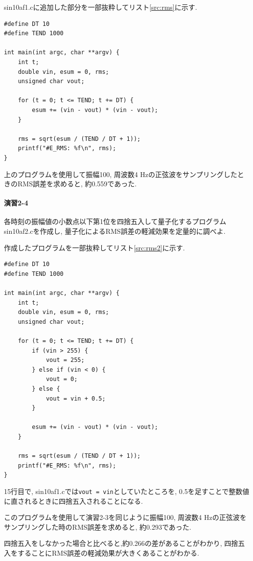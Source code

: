 \documentclass[titlepage]{jsarticle}
\begin{document}
        sin10af1.cに追加した部分を一部抜粋してリスト\ref{src:rms}に示す.
        

        \begin{lstlisting}[caption=sin10af1.c, label=src:rms]
#define DT 10
#define TEND 1000

int main(int argc, char **argv) {
    int t;
    double vin, esum = 0, rms;
    unsigned char vout;

    for (t = 0; t <= TEND; t += DT) {
        esum += (vin - vout) * (vin - vout);
    }

    rms = sqrt(esum / (TEND / DT + 1));
    printf("#E_RMS: %f\n", rms);
}\end{lstlisting}

        上のプログラムを使用して振幅100, 周波数4 Hzの正弦波をサンプリングしたときのRMS誤差を求めると,
        約0.559であった.

    \paragraph{演習2-4} 各時刻の振幅値の小数点以下第1位を四捨五入して量子化するプログラムsin10af2.cを作成し,
    量子化によるRMS誤差の軽減効果を定量的に調べよ.

        作成したプログラムを一部抜粋してリスト\ref{src:rms2}に示す.

        \begin{lstlisting}[caption=sin10af2.c, label=src:rms2]
#define DT 10
#define TEND 1000

int main(int argc, char **argv) {
    int t;
    double vin, esum = 0, rms;
    unsigned char vout;

    for (t = 0; t <= TEND; t += DT) {
        if (vin > 255) {
            vout = 255;
        } else if (vin < 0) {
            vout = 0;
        } else {
            vout = vin + 0.5;
        }

        esum += (vin - vout) * (vin - vout);
    }

    rms = sqrt(esum / (TEND / DT + 1));
    printf("#E_RMS: %f\n", rms);
}\end{lstlisting}

        15行目で, sin10af1.cでは\verb|vout = vin|としていたところを,
        0.5を足すことで整数値に直されるときに四捨五入されることになる.

        このプログラムを使用して演習2-3を同じように振幅100, 周波数4 Hzの正弦波をサンプリングした時のRMS誤差を求めると,
        約0.293であった.

        四捨五入をしなかった場合と比べると,約0.266の差があることがわかり,
        四捨五入をすることにRMS誤差の軽減効果が大きくあることがわかる.
\end{document}
